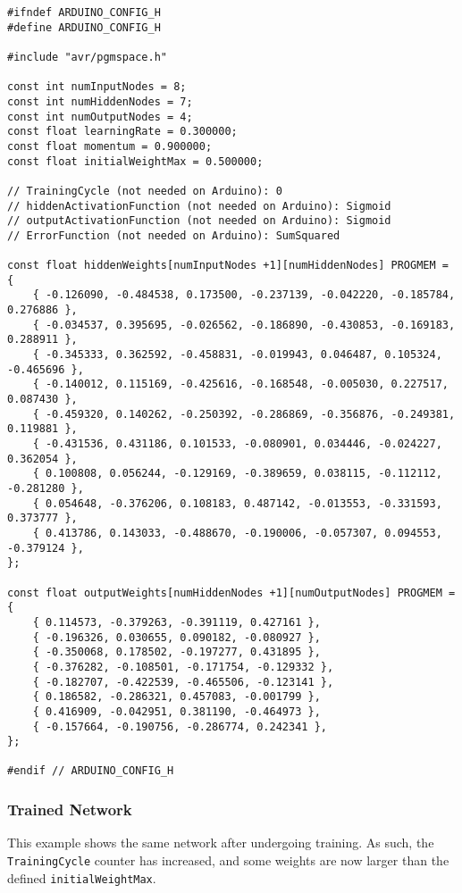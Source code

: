 \documentclass[a4paper]{article}
\begin{document}
\begin{lstlisting}
#ifndef ARDUINO_CONFIG_H
#define ARDUINO_CONFIG_H

#include "avr/pgmspace.h"

const int numInputNodes = 8;
const int numHiddenNodes = 7;
const int numOutputNodes = 4;
const float learningRate = 0.300000;
const float momentum = 0.900000;
const float initialWeightMax = 0.500000;

// TrainingCycle (not needed on Arduino): 0
// hiddenActivationFunction (not needed on Arduino): Sigmoid
// outputActivationFunction (not needed on Arduino): Sigmoid
// ErrorFunction (not needed on Arduino): SumSquared

const float hiddenWeights[numInputNodes +1][numHiddenNodes] PROGMEM = {
    { -0.126090, -0.484538, 0.173500, -0.237139, -0.042220, -0.185784, 0.276886 }, 
    { -0.034537, 0.395695, -0.026562, -0.186890, -0.430853, -0.169183, 0.288911 }, 
    { -0.345333, 0.362592, -0.458831, -0.019943, 0.046487, 0.105324, -0.465696 }, 
    { -0.140012, 0.115169, -0.425616, -0.168548, -0.005030, 0.227517, 0.087430 }, 
    { -0.459320, 0.140262, -0.250392, -0.286869, -0.356876, -0.249381, 0.119881 }, 
    { -0.431536, 0.431186, 0.101533, -0.080901, 0.034446, -0.024227, 0.362054 }, 
    { 0.100808, 0.056244, -0.129169, -0.389659, 0.038115, -0.112112, -0.281280 }, 
    { 0.054648, -0.376206, 0.108183, 0.487142, -0.013553, -0.331593, 0.373777 }, 
    { 0.413786, 0.143033, -0.488670, -0.190006, -0.057307, 0.094553, -0.379124 }, 
};

const float outputWeights[numHiddenNodes +1][numOutputNodes] PROGMEM = {
    { 0.114573, -0.379263, -0.391119, 0.427161 }, 
    { -0.196326, 0.030655, 0.090182, -0.080927 }, 
    { -0.350068, 0.178502, -0.197277, 0.431895 }, 
    { -0.376282, -0.108501, -0.171754, -0.129332 }, 
    { -0.182707, -0.422539, -0.465506, -0.123141 }, 
    { 0.186582, -0.286321, 0.457083, -0.001799 }, 
    { 0.416909, -0.042951, 0.381190, -0.464973 }, 
    { -0.157664, -0.190756, -0.286774, 0.242341 }, 
};

#endif // ARDUINO_CONFIG_H
\end{lstlisting}

\subsubsection{Trained Network}

This example shows the same network after undergoing training. As such, the \lstinline{TrainingCycle} counter has increased, and some weights are now larger than the defined \lstinline{initialWeightMax}.
\end{document}
